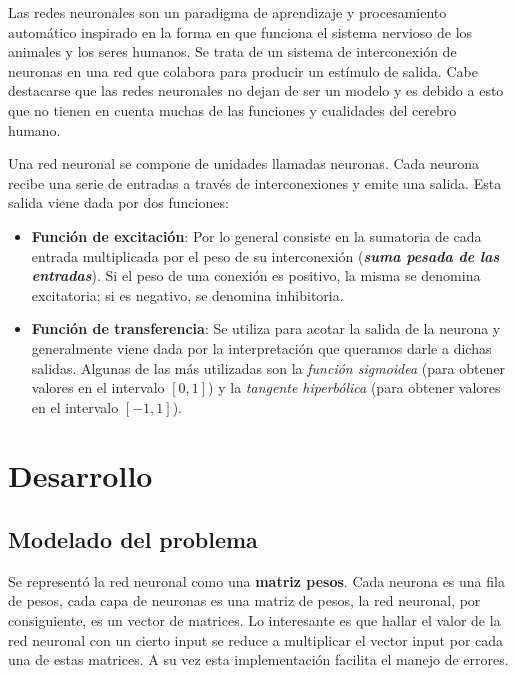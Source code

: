 \documentclass[%
    final,
    reprint,
    notitlepage,
    narroweqnarray,
    inline,
    twoside,
    invited
    ]{ieee}
\begin{document}
\PARstart Las redes neuronales son un paradigma de aprendizaje y procesamiento automático inspirado en la forma en que funciona el sistema nervioso de los animales y los seres humanos. Se trata de un sistema de interconexión de neuronas en una red que colabora para producir un estímulo de salida. Cabe destacarse que las redes neuronales no dejan de ser un modelo y es debido a esto que no tienen en cuenta muchas de las funciones y cualidades del cerebro humano.
\par Una red neuronal se compone de unidades llamadas neuronas. Cada neurona recibe una serie de entradas a través de interconexiones y emite una salida. Esta salida viene dada por dos funciones:
\begin{itemize}
\item \textbf{Función de excitación}: Por lo general consiste en la sumatoria de cada entrada multiplicada por el peso de su interconexión (\textit{\textbf{suma pesada de las entradas}}). Si el peso de una conexión es positivo, la misma se denomina excitatoria; si es negativo, se denomina inhibitoria.
\item \textbf{Función de transferencia}:  Se utiliza para acotar la salida de la neurona y generalmente viene dada por la interpretación que queramos darle a dichas salidas. Algunas de las más utilizadas son la \textit{función sigmoidea} (para obtener valores en el intervalo $[0,1]$) y la \textit{tangente hiperbólica} (para obtener valores en el intervalo $[-1,1]$).
\end{itemize}


\section{Desarrollo}

\subsection{Modelado del problema}

\par Se representó la red neuronal como una \textbf{matriz pesos}. Cada neurona es una fila de pesos, cada capa de neuronas es una matriz de pesos, la red neuronal, por consiguiente, es un vector de matrices. Lo interesante es que hallar el valor de la red neuronal con un cierto input se reduce a multiplicar el vector input por cada una de estas matrices. A su vez esta implementación facilita el manejo de errores.
\end{document}
